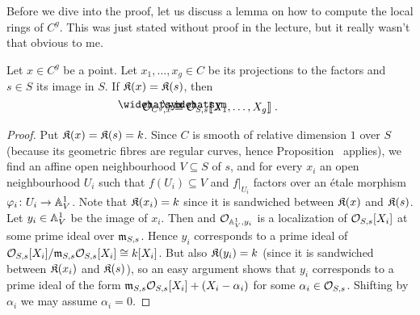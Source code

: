 \documentclass[a4paper,parskip=half,numbers=enddot, DIV=12]{scrreprt}
\begin{document}
Before we dive into the proof, let us discuss a lemma on how to compute the local rings of $C^g$. This was just stated without proof in the lecture, but it really wasn't that obvious to me.
\begin{lem}
	Let $x\in C^g$ be a point. Let $x_1,\ldots,x_g\in C$ be its projections to the factors and $s\in S$ its image in $S$. If $\mathfrak{K}(x)=\mathfrak{K}(s)$, then
	\begin{align*}
		\roof{\Oo}_{C^g,x}\cong \roof{\Oo}_{S,s}\llbracket X_1,\ldots,X_g\rrbracket\;.
	\end{align*}
\end{lem}
\begin{proof}
	Put $\mathfrak{K}(x)=\mathfrak{K}(s)=k$. Since $C$ is smooth of relative dimension $1$ over $S$ (because its geometric fibres are regular curves, hence Proposition~ applies), we find an affine open neighbourhood $V\subseteq S$ of $s$, and for every $x_i$ an open neighbourhood $U_i$ such that $f(U_i)\subseteq V$ and $f|_{U_i}$ factors over an étale morphism $\phi_i\colon U_i\morphism\IA_V^1$. Note that $\mathfrak{K}(x_i)=k$ since it is sandwiched between $\mathfrak{K}(x)$ and $\mathfrak{K}(s)$. Let $y_i\in \mathbb{A}_V^1$ be the image of $x_i$. Then and $\mathcal{O}_{\mathbb{A}_V^1,y_i}$ is a localization of $\mathcal{O}_{S,s}[X_i]$ at some prime ideal over $\mathfrak{m}_{S,s}$. Hence $y_i$ corresponds to a prime ideal of $\mathcal{O}_{S,s}[X_i]/\mathfrak{m}_{S,s}\mathcal{O}_{S,s}[X_i]\cong k[X_i]$. But also $\mathfrak{K}(y_i)=k$ (since it is sandwiched between $\mathfrak{K}(x_i)$ and $\mathfrak{K}(s)$), so an easy argument shows that $y_i$ corresponds to a prime ideal of the form $\mathfrak{m}_{S,s}\mathcal{O}_{S,s}[X_i]+(X_i-\alpha_i)$ for some $\alpha_i\in\mathcal{O}_{S,s}$. Shifting by $\alpha_i$ we may assume $\alpha_i=0$.
	

\end{proof}
\end{document}
